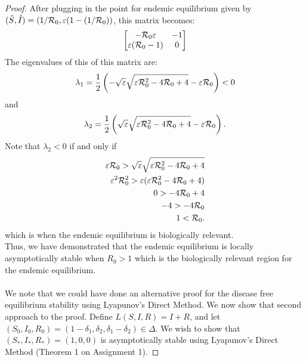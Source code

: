 \documentclass[12pt]{article}\usepackage[]{graphicx}\usepackage[]{color}
\begin{document}
\begin{enumerate}[(a)]
{\begin{proof}
{After plugging in the point for endemic equilibrium given by $(\hat{S},\hat{I})=(1/{\cal R}_0, \varepsilon(1-(1/{\cal R}_0))$, this matrix becomes:
\begin{equation}
\begin{bmatrix}
-{\cal R}_0\varepsilon & -1\\
\varepsilon({\cal R}_0-1) & 0
\end{bmatrix}
\end{equation}
The eigenvalues of this of this matrix are:
$$
\lambda_1 = \frac{1}{2} \left( - \sqrt{\varepsilon} \sqrt{\varepsilon{\cal R}_0^2 - 4 {\cal R}_0 + 4} - \varepsilon {\cal R}_0\right) < 0
$$
and
$$
\lambda_2 = \frac{1}{2}\left(\sqrt{\varepsilon} \sqrt{\varepsilon{\cal R}_0^2 - 4 {\cal R}_0 + 4} - \varepsilon {\cal R}_0\right).
$$
Note that $\lambda_2 < 0$ if and only if 
\begin{equation}
\begin{aligned}
\varepsilon {\cal R}_0 > \sqrt\varepsilon \sqrt{\varepsilon{\cal R}_0^2 - 4 {\cal R}_0 + 4} \\
\varepsilon^2 {\cal R}_0^2 > \varepsilon (\varepsilon {\cal R}_0^2 - 4{\cal R}_0 + 4)\\
0 > -4 {\cal R}_0 + 4\\
-4 > -4 {\cal R}_0\\
1 < {\cal R}_0.
\end{aligned}
\end{equation}
which is when the endemic equilibrium is biologically relevant. \\
Thus, we have demonstrated that the endemic equilibrium is locally asymptotically stable when $R_0>1$ which is the biologically relevant region for the endemic equilibrium.
\\\\
We note that we could have done an alternative proof for the disease free equilibrium stability using Lyapunov's Direct Method. We now show that second approach to the proof. Define $L(S, I, R) = I+R$, and let $(S_0, I_0, R_0) = (1- \delta_1, \delta_2, \delta_1 - \delta_2) \in \Delta$. We wish to show that $(S_\ast, I_\ast, R_\ast) = (1, 0, 0)$ is asymptotically stable using Lyapunov's Direct Method (Theorem 1 on Assignment 1).

}
\end{proof}}
\end{enumerate}
\end{document}
